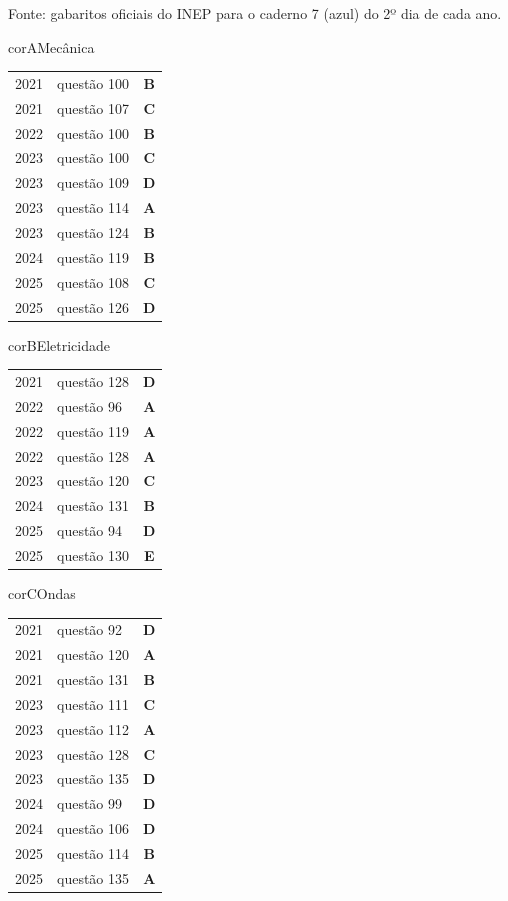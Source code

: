 \clearpage{}\label{pg:gab}
{\small Fonte: gabaritos oficiais do INEP para o caderno 7 (azul) do 2º dia de cada ano.\par}\medskip
\begin{tcbraster}[fileira=3,raster column skip=3mm]
\begin{bolso}{corA}{Mecânica}
\centering\renewcommand{\arraystretch}{1.25}\begin{tabular}{@{}l@{\quad}l@{\quad}c@{}}
2021 & questão 100 & \textbf{B}\\
2021 & questão 107 & \textbf{C}\\
2022 & questão 100 & \textbf{B}\\
2023 & questão 100 & \textbf{C}\\
2023 & questão 109 & \textbf{D}\\
2023 & questão 114 & \textbf{A}\\
2023 & questão 124 & \textbf{B}\\
2024 & questão 119 & \textbf{B}\\
2025 & questão 108 & \textbf{C}\\
2025 & questão 126 & \textbf{D}
\end{tabular}
\end{bolso}
\begin{bolso}{corB}{Eletricidade}
\centering\renewcommand{\arraystretch}{1.25}\begin{tabular}{@{}l@{\quad}l@{\quad}c@{}}
2021 & questão 128 & \textbf{D}\\
2022 & questão 96 & \textbf{A}\\
2022 & questão 119 & \textbf{A}\\
2022 & questão 128 & \textbf{A}\\
2023 & questão 120 & \textbf{C}\\
2024 & questão 131 & \textbf{B}\\
2025 & questão 94 & \textbf{D}\\
2025 & questão 130 & \textbf{E}
\end{tabular}
\end{bolso}
\begin{bolso}{corC}{Ondas}
\centering\renewcommand{\arraystretch}{1.25}\begin{tabular}{@{}l@{\quad}l@{\quad}c@{}}
2021 & questão 92 & \textbf{D}\\
2021 & questão 120 & \textbf{A}\\
2021 & questão 131 & \textbf{B}\\
2023 & questão 111 & \textbf{C}\\
2023 & questão 112 & \textbf{A}\\
2023 & questão 128 & \textbf{C}\\
2023 & questão 135 & \textbf{D}\\
2024 & questão 99 & \textbf{D}\\
2024 & questão 106 & \textbf{D}\\
2025 & questão 114 & \textbf{B}\\
2025 & questão 135 & \textbf{A}
\end{tabular}
\end{bolso}
\end{tcbraster}
